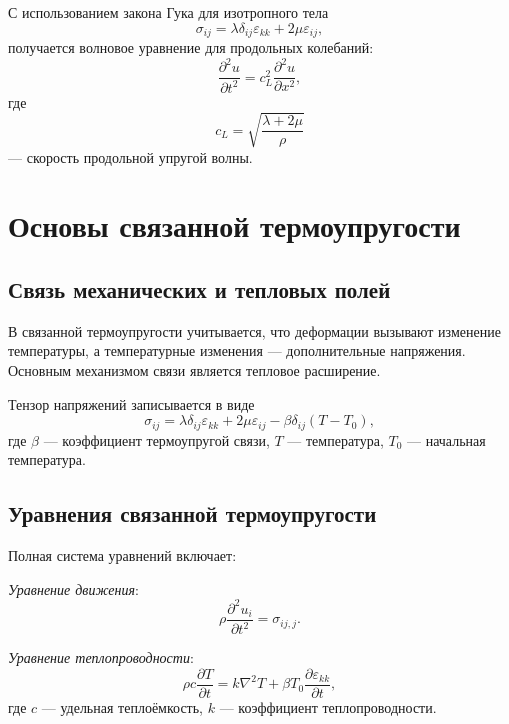\documentclass[12pt]{article}
\begin{document}
С использованием закона Гука для изотропного тела
\begin{equation}
\sigma_{ij}
=
\lambda \delta_{ij} \varepsilon_{kk}
+
2\mu \varepsilon_{ij},
\end{equation}
получается волновое уравнение для продольных колебаний:
\begin{equation}
\frac{\partial^2 u}{\partial t^2}
=
c_L^2 \frac{\partial^2 u}{\partial x^2},
\end{equation}
где
\begin{equation}
c_L = \sqrt{\frac{\lambda + 2\mu}{\rho}}
\end{equation}
— скорость продольной упругой волны.

\section{Основы связанной термоупругости}

\subsection{Связь механических и тепловых полей}

В связанной термоупругости учитывается,
что деформации вызывают изменение температуры,
а температурные изменения — дополнительные напряжения.
Основным механизмом связи является тепловое расширение.

Тензор напряжений записывается в виде
\begin{equation}
\sigma_{ij}
=
\lambda \delta_{ij} \varepsilon_{kk}
+
2\mu \varepsilon_{ij}
-
\beta \delta_{ij} (T - T_0),
\end{equation}
где $\beta$ — коэффициент термоупругой связи,
$T$ — температура,
$T_0$ — начальная температура.

\subsection{Уравнения связанной термоупругости}

Полная система уравнений включает:

\textit{Уравнение движения}:
\begin{equation}
\rho \frac{\partial^2 u_i}{\partial t^2}
=
\sigma_{ij,j}.
\end{equation}

\textit{Уравнение теплопроводности}:
\begin{equation}
\rho c \frac{\partial T}{\partial t}
=
k \nabla^2 T
+
\beta T_0 \frac{\partial \varepsilon_{kk}}{\partial t},
\end{equation}
где $c$ — удельная теплоёмкость,
$k$ — коэффициент теплопроводности.
\end{document}
